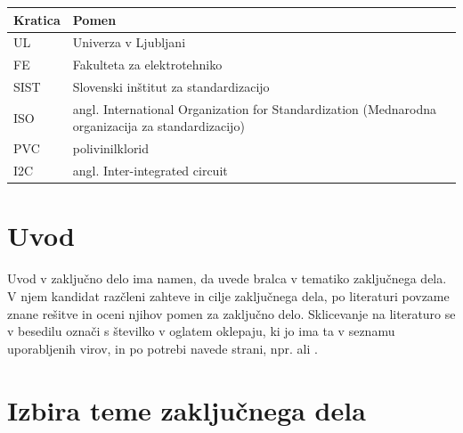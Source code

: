 \documentclass[a4paper,twoside,openright,12pt,slovene]{book}
\begin{document}
\begin{center}
    \begin{longtable}{p{2.5cm}|p{11cm}} \hline %
        Kratica                & Pomen              \\ \hline\endhead %
        \hline\endfoot %
        UL                 & Univerza v Ljubljani                                          \\
        FE                 & Fakulteta za elektrotehniko                            \\
        SIST               & Slovenski inštitut za standardizacijo                        \\
        ISO                & angl. International Organization for Standardization (Mednarodna organizacija za standardizacijo)\\
        PVC                & polivinilklorid                               \\
        I2C                & angl. Inter-integrated circuit                                             \\
    \end{longtable}
\end{center}



\mainmatter

\chapter{Uvod} \label{uvod}

Uvod v zaključno delo ima namen, da uvede bralca v tematiko zaključnega dela. V njem kandidat razčleni zahteve in cilje zaključnega dela, po literaturi povzame znane rešitve in oceni njihov pomen za zaključno delo. Sklicevanje na literaturo se v besedilu označi s številko v oglatem oklepaju, ki jo ima ta v seznamu uporabljenih virov, in po potrebi navede strani, npr. \cite{miklavcic2010objavljanje} ali \cite[stran 520-534]{juznic1992diplomska}.


\chapter{Izbira teme zaključnega dela} \label{izbira_teme}
\end{document}

